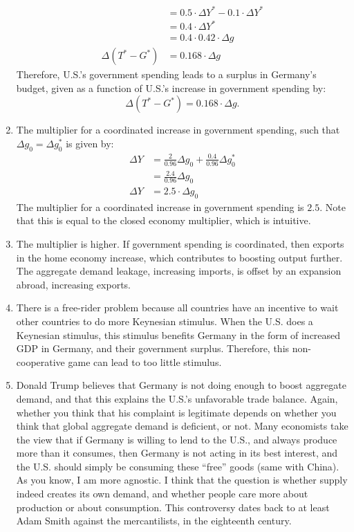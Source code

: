\documentclass[]{book}
\begin{document}
\begin{enumerate}
\[\begin{aligned}
  &= 0.5 \cdot \Delta Y^{*} - 0.1 \cdot\Delta Y^{*}\\
  &= 0.4 \cdot \Delta Y^{*}\\
  &= 0.4 \cdot 0.42 \cdot \Delta g \\
  \Delta (T^{*}-G^{*}) &= 0.168 \cdot \Delta g
  \end{aligned}
  \] Therefore, U.S.'s government spending leads to a surplus in
  Germany's budget, given as a function of U.S.'s increase in government
  spending by: \[\boxed{\Delta (T^{*}-G^{*}) = 0.168 \cdot \Delta g}.\]
\item
  The multiplier for a coordinated increase in government spending, such
  that \(\Delta g_0 = \Delta g_0^{*}\) is given by: \[
  \begin{aligned}
  \Delta Y&=\frac{2}{0.96} \Delta g_0 + \frac{0.4}{0.96} \Delta g_0^{*}\\
  &=\frac{2.4}{0.96} \Delta g_0 \\
  \Delta Y&= 2.5 \cdot \Delta g_0
  \end{aligned}
  \] The multiplier for a coordinated increase in government spending is
  \(2.5\). Note that this is equal to the closed economy multiplier,
  which is intuitive.
\item
  The multiplier is higher. If government spending is coordinated, then
  exports in the home economy increase, which contributes to boosting
  output further. The aggregate demand leakage, increasing imports, is
  offset by an expansion abroad, increasing exports.
\item
  There is a free-rider problem because all countries have an incentive
  to wait other countries to do more Keynesian stimulus. When the U.S.
  does a Keynesian stimulus, this stimulus benefits Germany in the form
  of increased GDP in Germany, and their government surplus. Therefore,
  this non-cooperative game can lead to too little stimulus.
\item
  Donald Trump believes that Germany is not doing enough to boost
  aggregate demand, and that this explains the U.S.'s unfavorable trade
  balance. Again, whether you think that his complaint is legitimate
  depends on whether you think that global aggregate demand is
  deficient, or not. Many economists take the view that if Germany is
  willing to lend to the U.S., and always produce more than it consumes,
  then Germany is not acting in its best interest, and the U.S. should
  simply be consuming these ``free'' goods (same with China). As you
  know, I am more agnostic. I think that the question is whether supply
  indeed creates its own demand, and whether people care more about
  production or about consumption. This controversy dates back to at
  least Adam Smith against the mercantilists, in the eighteenth century.
\end{enumerate}


\end{document}
